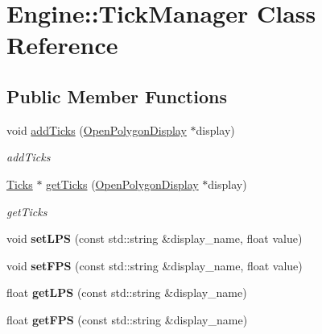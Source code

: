 \hypertarget{classEngine_1_1TickManager}{}\section{Engine\+:\+:Tick\+Manager Class Reference}
\label{classEngine_1_1TickManager}
\subsection*{Public Member Functions}
\begin{DoxyCompactItemize}
\item 
void \hyperlink{classEngine_1_1TickManager_a876bf6db6791777c7208b2b313416a61}{add\+Ticks} (\hyperlink{classEngine_1_1OpenPolygonDisplay}{Open\+Polygon\+Display} $\ast$display)
\begin{DoxyCompactList}\small\item\em add\+Ticks \end{DoxyCompactList}\item 
\hyperlink{structEngine_1_1Ticks}{Ticks} $\ast$ \hyperlink{classEngine_1_1TickManager_a14a556181f5570d3ce368a025b93432e}{get\+Ticks} (\hyperlink{classEngine_1_1OpenPolygonDisplay}{Open\+Polygon\+Display} $\ast$display)
\begin{DoxyCompactList}\small\item\em get\+Ticks \end{DoxyCompactList}\item 
\hypertarget{classEngine_1_1TickManager_afe72ac666cc759f79f7d8848fc283c08}{}void {\bfseries set\+L\+P\+S} (const std\+::string \&display\+\_\+name, float value)\label{classEngine_1_1TickManager_afe72ac666cc759f79f7d8848fc283c08}

\item 
\hypertarget{classEngine_1_1TickManager_afa24b99f8a9dca3986d44b95ab976f2e}{}void {\bfseries set\+F\+P\+S} (const std\+::string \&display\+\_\+name, float value)\label{classEngine_1_1TickManager_afa24b99f8a9dca3986d44b95ab976f2e}

\item 
\hypertarget{classEngine_1_1TickManager_adaafe40c21445a87173cd6d09df12c35}{}float {\bfseries get\+L\+P\+S} (const std\+::string \&display\+\_\+name)\label{classEngine_1_1TickManager_adaafe40c21445a87173cd6d09df12c35}

\item 
\hypertarget{classEngine_1_1TickManager_a742442e10e97f4a9f8a35ed0dd911ee5}{}float {\bfseries get\+F\+P\+S} (const std\+::string \&display\+\_\+name)\label{classEngine_1_1TickManager_a742442e10e97f4a9f8a35ed0dd911ee5}

\end{DoxyCompactItemize}


